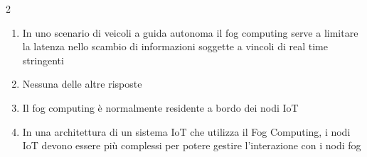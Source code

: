 \documentclass[10pt]{article}
\begin{document}
\begin{multicols}{2}
\begin{enumerate}[label=\arabic*.]
\item In uno scenario di veicoli a guida autonoma il fog computing serve a limitare la latenza nello scambio di informazioni soggette a vincoli di real time stringenti
\item Nessuna delle altre risposte
\item Il fog computing è normalmente residente a bordo dei nodi IoT
\item In una architettura di un sistema IoT che utilizza il Fog Computing, i nodi IoT devono essere più complessi per potere gestire l’interazione con i nodi fog
\end{enumerate}
\end{multicols}

\newpage
\end{document}

